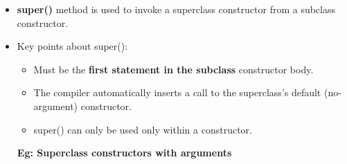 \setlength{\columnsep}{3pt}
\begin{flushleft}
	
	\begin{itemize}
		\item \textbf{super()} method is used to invoke a superclass constructor from a subclass constructor. 
		
		\item Key points about super():
		\begin{itemize}
			\item Must be the \textbf{first statement in the subclass} constructor body.
			\item The compiler automatically inserts a call to the superclass's default (no-argument) constructor.
			\item super() can only be used only within a constructor.
		\end{itemize}	
		\textbf{Eg: Superclass constructors with arguments}
		\bigskip
		
	\end{itemize}
	
\end{flushleft}

\newpage